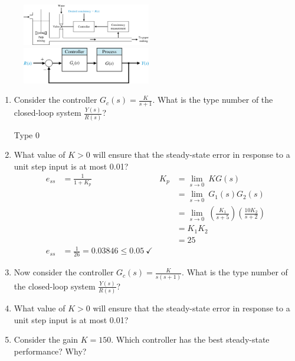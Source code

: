 \documentclass[11pt]{article}
\begin{document}
\begin{enumerate}
        \begin{figure}[h!]
        \includegraphics[width=0.5\textwidth]{./Images/Fig04-003.png}
        \includegraphics[width=0.5\textwidth]{./Images/Fig04-004.png}
        \end{figure}
        \begin{enumerate}
            \item Consider the controller \( G_c(s) = \displaystyle \frac{K}{s+1} \). What is the type number of the closed-loop system \(\frac{Y(s)}{R(s)}\)?
            \begin{center}
                Type 0
            \end{center}
            \item What value of \( K > 0 \) will ensure that the steady-state error in response to a unit step input is at most 0.01?
            \begin{align*}
                e_{ss} &=\frac{1}{1+K_p} &K_p &= \lim_{s \to 0}\ KG(s)\\
                &&&=\lim_{s \to 0}\ G_1(s)G_2(s)\\
                &&&=\lim_{s \to 0}\ \left( \frac{K_1}{s+5} \right) \left( \frac{10K_2}{s+2} \right)\\
                &&&=K_1K_2\\
                &&&=25\\
                e_{ss} &=\frac{1}{26} =0.03846 \leq 0.05\ \checkmark
            \end{align*}
            \item Now consider the controller \( G_c(s) = \displaystyle \frac{K}{s(s+1)} \). What is the type number of the closed-loop system \(\frac{Y(s)}{R(s)}\)?
            \item What value of \( K > 0 \) will ensure that the steady-state error in response to a unit step input is at most 0.01?
            \item Consider the gain \( K = 150 \). Which controller has the best steady-state performance? Why?
        \end{enumerate}
\end{enumerate}
\end{document}
